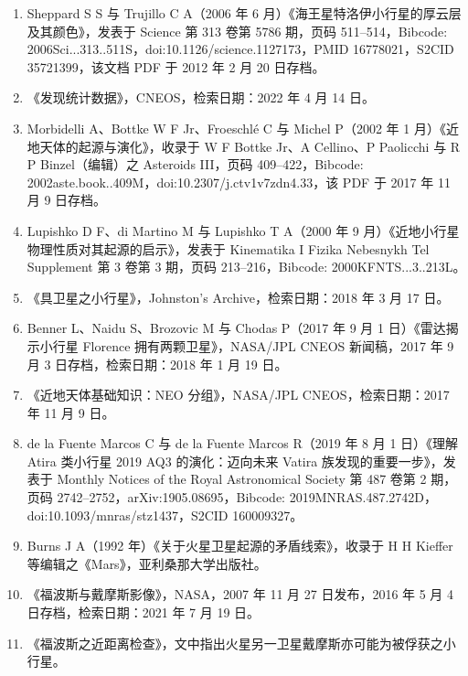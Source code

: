 \begin{enumerate}
\item Sheppard S S 与 Trujillo C A（2006 年 6 月）《海王星特洛伊小行星的厚云层及其颜色》，发表于 Science 第 313 卷第 5786 期，页码 511–514，Bibcode: 2006Sci...313..511S，doi:10.1126/science.1127173，PMID 16778021，S2CID 35721399，该文档 PDF 于 2012 年 2 月 20 日存档。

\item 《发现统计数据》，CNEOS，检索日期：2022 年 4 月 14 日。

\item Morbidelli A、Bottke W F Jr、Froeschlé C 与 Michel P（2002 年 1 月）《近地天体的起源与演化》，收录于 W F Bottke Jr、A Cellino、P Paolicchi 与 R P Binzel（编辑）之 Asteroids III，页码 409–422，Bibcode: 2002aste.book..409M，doi:10.2307/j.ctv1v7zdn4.33，该 PDF 于 2017 年 11 月 9 日存档。

\item Lupishko D F、di Martino M 与 Lupishko T A（2000 年 9 月）《近地小行星物理性质对其起源的启示》，发表于 Kinematika I Fizika Nebesnykh Tel Supplement 第 3 卷第 3 期，页码 213–216，Bibcode: 2000KFNTS...3..213L。

\item 《具卫星之小行星》，Johnston’s Archive，检索日期：2018 年 3 月 17 日。

\item Benner L、Naidu S、Brozovic M 与 Chodas P（2017 年 9 月 1 日）《雷达揭示小行星 Florence 拥有两颗卫星》，NASA/JPL CNEOS 新闻稿，2017 年 9 月 3 日存档，检索日期：2018 年 1 月 19 日。

\item 《近地天体基础知识：NEO 分组》，NASA/JPL CNEOS，检索日期：2017 年 11 月 9 日。

\item de la Fuente Marcos C 与 de la Fuente Marcos R（2019 年 8 月 1 日）《理解 Atira 类小行星 2019 AQ3 的演化：迈向未来 Vatira 族发现的重要一步》，发表于 Monthly Notices of the Royal Astronomical Society 第 487 卷第 2 期，页码 2742–2752，arXiv:1905.08695，Bibcode: 2019MNRAS.487.2742D，doi:10.1093/mnras/stz1437，S2CID 160009327。

\item Burns J A（1992 年）《关于火星卫星起源的矛盾线索》，收录于 H H Kieffer 等编辑之《Mars》，亚利桑那大学出版社。

\item 《福波斯与戴摩斯影像》，NASA，2007 年 11 月 27 日发布，2016 年 5 月 4 日存档，检索日期：2021 年 7 月 19 日。

\item 《福波斯之近距离检查》，文中指出火星另一卫星戴摩斯亦可能为被俘获之小行星。


\end{enumerate}

